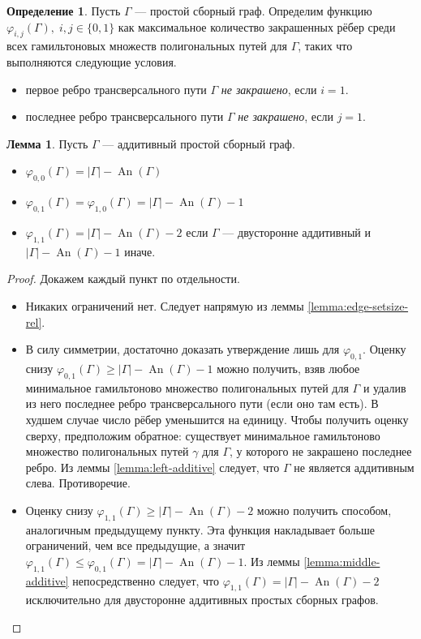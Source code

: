 \documentclass{article}
\theoremstyle{definition}
\newtheorem{definition}[theorem]{Определение}
\newtheorem{lemma}[theorem]{Лемма}
\newcommand{\An}{\operatorname{An}}
\begin{document}
\begin{definition}
    Пусть $\Gamma$ — простой сборный граф. Определим функцию $\varphi_{i,j}(\Gamma),\; i,j \in \{0,1\}$ как максимальное количество закрашенных рёбер среди всех гамильтоновых множеств полигональных путей для $\Gamma$, таких что выполняются следующие условия.

    \begin{itemize}
        \item первое ребро трансверсального пути $\Gamma$ \emph{не закрашено}, если $i = 1$.
        \item последнее ребро трансверсального пути $\Gamma$ \emph{не закрашено}, если $j = 1$.
    \end{itemize}
\end{definition}

\begin{lemma}
    Пусть $\Gamma$ — аддитивный простой сборный граф.
    \begin{itemize}
        \item $\varphi_{0,0}(\Gamma) = |\Gamma| - \An(\Gamma)$
        \item $\varphi_{0,1}(\Gamma) = \varphi_{1,0}(\Gamma) = |\Gamma| - \An(\Gamma) - 1$
        \item $\varphi_{1,1}(\Gamma) = |\Gamma| - \An(\Gamma) - 2$ если $\Gamma$ — двусторонне аддитивный и $|\Gamma| - \An(\Gamma) - 1$ иначе.
    \end{itemize}
\end{lemma}

\begin{proof}
    Докажем каждый пункт по отдельности.
    \begin{itemize}
        \item Никаких ограничений нет. Следует напрямую из леммы \ref{lemma:edge-setsize-rel}.
        \item В силу симметрии, достаточно доказать утверждение лишь для $\varphi_{0,1}$. Оценку снизу $\varphi_{0,1}(\Gamma) \geq |\Gamma| - \An(\Gamma) - 1$ можно получить, взяв любое минимальное гамильтоново множество полигональных путей для $\Gamma$ и удалив из него последнее ребро трансверсального пути (если оно там есть). В худшем случае число рёбер уменьшится на единицу. Чтобы получить оценку сверху, предположим обратное: существует минимальное гамильтоново множество полигональных путей $\gamma$ для $\Gamma$, у которого не закрашено последнее ребро. Из леммы \ref{lemma:left-additive} следует, что $\Gamma$ не является аддитивным слева. Противоречие.
        \item Оценку снизу $\varphi_{1,1}(\Gamma) \geq |\Gamma| - \An(\Gamma) - 2$ можно получить способом, аналогичным предыдущему пункту. Эта функция накладывает больше ограничений, чем все предыдущие, а значит $\varphi_{1,1}(\Gamma) \leq \varphi_{0,1}(\Gamma) = |\Gamma| - \An(\Gamma) - 1$. Из леммы \ref{lemma:middle-additive} непосредственно следует, что $\varphi_{1,1}(\Gamma) = |\Gamma| - \An(\Gamma) - 2$ исключительно для двусторонне аддитивных простых сборных графов. 
    \end{itemize}
\end{proof}
\end{document}
